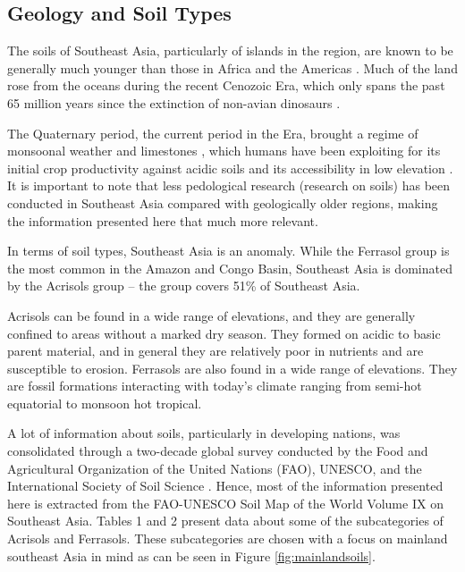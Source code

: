 \subsection{Geology and Soil Types}

The soils of Southeast Asia, particularly of islands in the region, are known to be generally much younger than those in Africa and the Americas \citep{juo2003tropical}. Much of the land rose from the oceans during the recent Cenozoic Era, which only spans the past 65 million years since the extinction of non-avian dinosaurs \citep{hall2002cenozoic}. 

The Quaternary period, the current period in the Era, brought a regime of monsoonal weather and limestones \citep{verstappen1997effect}, which humans have been exploiting for its initial crop productivity against acidic soils and its accessibility in low elevation \citep{asio2006morphology}. It is important to note that less pedological research (research on soils) has been conducted in Southeast Asia compared with geologically older regions, making the information presented here that much more relevant. 

In terms of soil types, Southeast Asia is an anomaly. While the Ferrasol group is the most common in the Amazon and Congo Basin, Southeast Asia is dominated by the Acrisols group \citep{kyuma1966major} -- the group covers 51\% of Southeast Asia. 

Acrisols can be found in a wide range of elevations, and they are generally confined to areas without a marked dry season. They formed on acidic to basic parent material, and in general they are relatively poor in nutrients and are susceptible to erosion. Ferrasols are also found in a wide range of elevations. They are fossil formations interacting with today's climate ranging from semi-hot equatorial to monsoon hot tropical. 

A lot of information about soils, particularly in developing nations, was consolidated through a two-decade global survey conducted by the Food and Agricultural Organization of the United Nations (FAO), UNESCO, and the International Society of Soil Science \citep{dudal2005soils}. Hence, most of the information presented here is extracted from the FAO-UNESCO Soil Map of the World Volume IX on Southeast Asia. Tables 1 and 2 present data about some of the subcategories of Acrisols and Ferrasols. These subcategories are chosen with a focus on mainland southeast Asia in mind as can be seen in Figure \ref{fig:mainlandsoils}.

